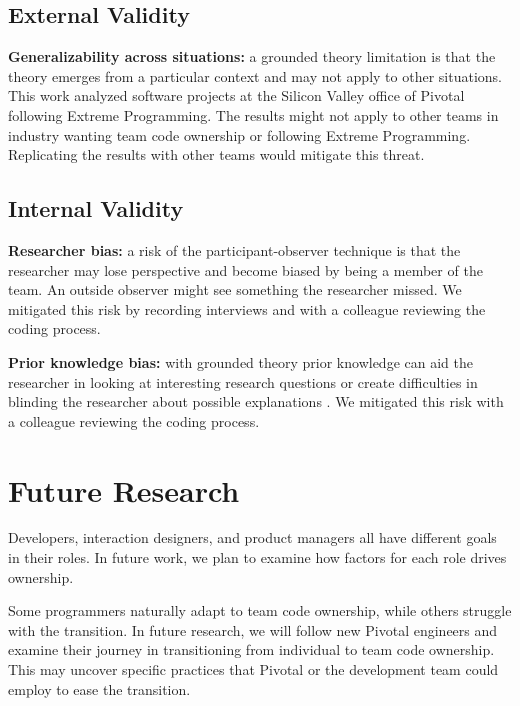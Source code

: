 \subsection{External Validity}

\textbf{Generalizability across situations:} a grounded theory limitation is that the theory emerges from a particular context and may not apply to other situations. This work analyzed software projects at the Silicon Valley office of Pivotal following Extreme Programming. The results might not apply to other teams in industry wanting team code ownership or following Extreme Programming. Replicating the results with other teams would mitigate this threat. 

\subsection{Internal Validity}
\textbf{Researcher bias:} a risk of the participant-observer technique is that the researcher may lose perspective and become biased by being a member of the team. An outside observer might see something the researcher missed. We mitigated this risk by recording interviews and with a colleague reviewing the coding process. 

\textbf{Prior knowledge bias:} with grounded theory prior knowledge can aid the researcher in looking at interesting research questions or create difficulties in blinding the researcher about possible explanations \cite{GlaserIssues}. We mitigated this risk with a colleague reviewing the coding process. 
\section{Future Research}
Developers, interaction designers, and product managers all have different goals in their roles. In future work, we plan to examine how factors for each role drives ownership.

Some programmers naturally adapt to team code ownership, while others struggle with the transition. In future research, we will follow new Pivotal engineers and examine their journey in transitioning from individual to team code ownership. This may uncover specific practices that Pivotal or the development team could employ to ease the transition. 

